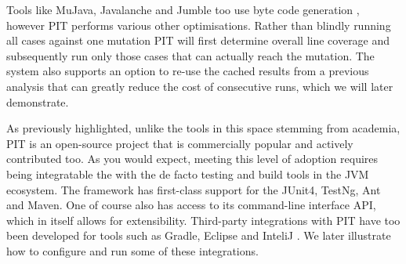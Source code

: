 \documentclass[a4paper]{article}
\begin{document}
Tools like MuJava, Javalanche and Jumble too use byte code generation \citep{Madeyski, Coles}, however 
PIT performs various other optimisations. Rather than blindly running all cases against one mutation PIT will first determine overall line coverage and subsequently run only those cases that can actually reach the mutation. The system also supports an option to re-use the cached results from a previous analysis that can greatly reduce the cost of consecutive runs, which we will later demonstrate.
\par
As previously highlighted, unlike the tools in this space stemming from academia, PIT is an open-source project that is commercially popular and actively contributed too. As you would expect, meeting this level of adoption requires being integratable the with the de facto testing and build tools in the JVM ecosystem. The framework has first-class support for the JUnit4, TestNg, Ant and Maven. One of course also has access to its  command-line interface API, which in itself allows for extensibility. Third-party integrations with PIT have too been developed for tools such as Gradle, Eclipse and InteliJ \citep{Coles}. We later illustrate how to configure and run some of these integrations.
\end{document}
